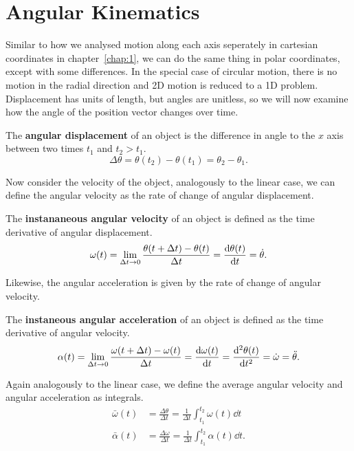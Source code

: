 \documentclass[../classical_mechanics.tex]{subfiles}
\begin{document}
    \section{Angular Kinematics}
        Similar to how we analysed motion along each axis seperately in cartesian coordinates in chapter~\ref{chap:1}, we can do the same thing in polar coordinates, except with some differences.
        In the special case of circular motion, there is no motion in the radial direction and 2D motion is reduced to a 1D problem.
        Displacement has units of length, but angles are unitless, so we will now examine how the angle of the position vector changes over time.
        \begin{definition}
            The \textbf{angular displacement} of an object is the difference in angle to the $x$ axis between two times $t_1$ and $t_2>t_1$.
            \begin{equation}
                \Delta\theta=\theta(t_2)-\theta(t_1)=\theta_2-\theta_1.
            \end{equation}
        \end{definition}
        Now consider the velocity of the object, analogously to the linear case, we can define the angular velocity as the rate of change of angular displacement.
        \begin{definition}
            The \textbf{instananeous angular velocity} of an object is defined as the time derivative of angular displacement.
            \begin{equation}
                \omega(t)=\lim_{\Delta t\to0}\frac{\theta(t+\Delta t)-\theta(t)}{\Delta t}=\dv{\theta(t)}{t}=\dot{\theta}.
            \end{equation}
        \end{definition}
        Likewise, the angular acceleration is given by the rate of change of angular velocity.
        \begin{definition}
            The \textbf{instaneous angular acceleration} of an object is defined as the time derivative of angular velocity.
            \begin{equation}
                \alpha(t)=\lim_{\Delta t\to0}\frac{\omega(t+\Delta t)-\omega(t)}{\Delta t}=\dv{\omega(t)}{t}=\dv[2]{\theta(t)}{t}=\dot{\omega}=\ddot{\theta}.
            \end{equation}
        \end{definition}
        Again analogously to the linear case, we define the average angular velocity and angular acceleration as integrals.
        \begin{align}
            \bar{\omega}(t)&=\frac{\Delta\theta}{\Delta t}=\frac{1}{\Delta t}\int_{t_1}^{t_2}\omega(t)\dd{t}\\
            \bar{\alpha}(t)&=\frac{\Delta\omega}{\Delta t}=\frac{1}{\Delta t}\int_{t_1}^{t_2}\alpha(t)\dd{t}.
        \end{align}
\end{document}
